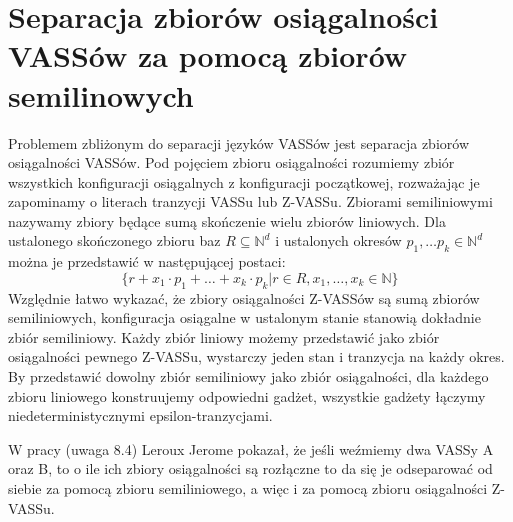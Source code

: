 \documentclass[magisterska]{pracamgr}
\begin{document}
    \section{Separacja zbiorów osiągalności VASSów za pomocą zbiorów semilinowych}
    Problemem zbliżonym do separacji języków VASSów jest separacja zbiorów osiągalności VASSów.
    Pod pojęciem zbioru osiągalności rozumiemy zbiór wszystkich konfiguracji osiągalnych z konfiguracji początkowej,
    rozważając je zapominamy o literach tranzycji VASSu lub Z-VASSu.
    Zbiorami semiliniowymi nazywamy zbiory będące sumą skończenie wielu zbiorów liniowych.
    Dla ustalonego skończonego zbioru baz $R \subseteq \mathbb{N}^d$ i ustalonych okresów $p_1, \dots p_k \in \mathbb{N}^d$
    można je przedstawić w następującej postaci:
    \[\{r+x_1 \cdot p_1+\dots+x_k \cdot p_k | r \in R, x_1, \dots ,x_k \in \mathbb{N}\}\]
    Względnie łatwo wykazać, że zbiory osiągalności Z-VASSów są sumą zbiorów semiliniowych, konfiguracja osiągalne w ustalonym stanie
    stanowią dokładnie zbiór semiliniowy.
    Każdy zbiór liniowy możemy przedstawić jako zbiór osiągalności pewnego Z-VASSu, wystarczy jeden stan i tranzycja na każdy okres.
    By przedstawić dowolny zbiór semiliniowy jako zbiór osiągalności, dla każdego zbioru liniowego konstruujemy odpowiedni gadżet,
    wszystkie gadżety łączymy niedeterministycznymi epsilon-tranzycjami.


    W pracy \cite{reach_sep_jerome} (uwaga 8.4)  Leroux Jerome
    pokazał, że jeśli weźmiemy dwa VASSy A oraz B, to o ile ich zbiory osiągalności są rozłączne to da się je odseparować
    od siebie za pomocą zbioru semiliniowego, a więc i za pomocą zbioru osiągalności Z-VASSu.
\end{document}
